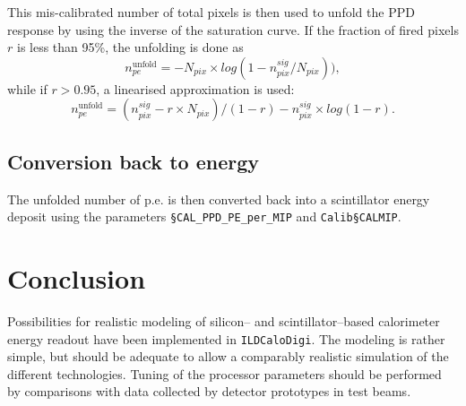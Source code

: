 \documentclass[12pt]{article} %
\begin{document}
This mis-calibrated number of total pixels is then used to
unfold the PPD response by using the inverse of the saturation curve.
If the fraction of fired pixels $r$ is less than 95\%, the unfolding is done as
\begin{equation*}
n_{pe}^\text{unfold} = - N_{pix} \times log ( 1 - n_{pix}^{sig} / N_{pix} ) ),
\end{equation*}
while if $r > 0.95$,  a linearised approximation is used:
\begin{equation*}
n_{pe}^\text{unfold} =
(n_{pix}^{sig} - r \times N_{pix})/(1-r) - n_{pix}^{sig} \times log ( 1 - r ).
\end{equation*}




\subsection*{Conversion back to energy}
The unfolded number of p.e. is then converted back into a scintillator energy deposit using the parameters
{\tt \S CAL\_PPD\_PE\_per\_MIP}
and
{\tt Calib\S CALMIP}.

\section{Conclusion}
Possibilities for realistic modeling of silicon-- and scintillator--based calorimeter  energy readout have been
implemented in {\tt ILDCaloDigi}. The modeling is rather simple, but should be adequate to allow
a comparably realistic simulation of the different technologies.
Tuning of the processor parameters
should be performed by comparisons with data collected by detector prototypes in test beams.
\end{document}
